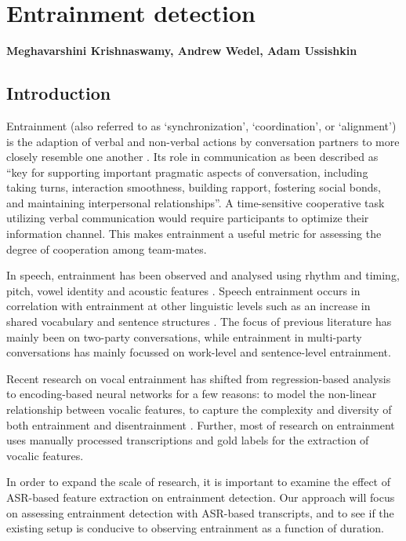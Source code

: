 \chapter{Entrainment detection}
\label{ch:entrainment}

\textbf{Meghavarshini Krishnaswamy, Andrew Wedel, Adam Ussishkin} \section{Introduction}

    Entrainment (also referred to as `synchronization', `coordination', or
    `alignment') is the adaption of verbal and non-verbal actions by
    conversation partners to more closely resemble one another
    \parencite{borrie2014}. Its role in communication as been described as
    ``key for supporting important pragmatic aspects of conversation, including
    taking turns, interaction smoothness, building rapport, fostering social
    bonds, and maintaining interpersonal relationships''\parencite{borrie2019}.
    A time-sensitive cooperative task utilizing verbal communication would
    require participants to optimize their information channel. This makes
    entrainment a useful metric for assessing the degree of cooperation among
    team-mates.

    In speech, entrainment has been observed and analysed using rhythm and
    timing, pitch, vowel identity and acoustic features
    \parencite{reichel2018prosodic,borrie2019syncing}. Speech entrainment
    occurs in correlation with entrainment at other linguistic levels such as
    an increase in shared vocabulary and sentence structures
    \parencite{rahimi2017entrainment}. The focus of previous literature has
    mainly been on two-party conversations, while entrainment in multi-party
    conversations has mainly focussed on work-level and sentence-level
    entrainment. 

    Recent research on vocal entrainment has shifted from regression-based
    analysis to encoding-based neural networks for a few reasons: to model the
    non-linear relationship between vocalic features, to capture the complexity
    and diversity of both entrainment and disentrainment \parencite{nasir2020}.
    Further, most of research on entrainment uses manually processed
    transcriptions and gold labels for the extraction of vocalic features. 

    In order to expand the scale of research, it is important to examine the
    effect of ASR-based feature extraction on entrainment detection. Our
    approach will focus on assessing entrainment detection with ASR-based
    transcripts, and to see if the existing setup is conducive to observing
    entrainment as a function of duration. 

